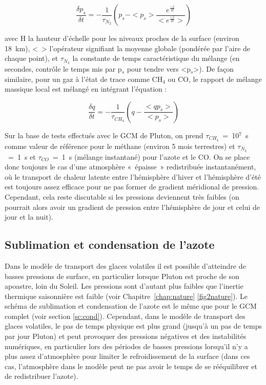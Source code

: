 \begin{equation}
\label{eq:newton}
\frac{\delta p_s}{\delta t}= -\frac{1}{\tau_{N_2}}\left ( p_s-< p_s> \frac{e^{\frac{-z}{H}}}{< e^{\frac{-z}{H}}> } \right )
\end{equation}

avec H  la hauteur d’échelle pour les niveaux proches de la surface (environ 18~km), <~> l’opérateur signifiant la moyenne globale (pondérée par l’aire de chaque point), et $\tau_{N_{2}}$ la constante de temps caractéristique du mélange (en secondes, contrôle le temps mis par p$_s$ pour tendre vers <p$_s$>). De façon similaire, pour un gaz à l’état de trace comme CH$_4$ ou CO, le rapport de mélange massique local est mélangé en intégrant l'équation : 

\begin{equation}
\frac{\delta q}{\delta t}= -\frac{1}{\tau_{CH_4}}\left ( q-\frac{< q p_s >}{< p_s >} \right )
\end{equation}

Sur la base de tests effectués avec le GCM de Pluton, on prend $\tau_{CH_4}$~=~10$^7$~s comme valeur de référence pour le méthane (environ 5 mois terrestres) et $\tau_{N_2}$~=~1~s et $\tau_{CO}$~=~1~s (mélange instantané) pour l’azote et le CO. 
On se place donc toujours le cas d’une atmosphère «~épaisse~» redistribuée instantanément, où le transport de chaleur latente entre l’hémisphère d’hiver et l’hémisphère d’été est toujours assez efficace pour ne pas former de gradient méridional de pression. Cependant, cela reste discutable si les pressions deviennent très faibles (on pourrait alors avoir un gradient de pression entre l'hémisphère de jour et celui de jour et la nuit). 

\subsection{Sublimation et condensation de l'azote}

Dans le modèle de transport des glaces volatiles il est possible d’atteindre de basses pressions de surface, en particulier lorsque Pluton est proche de son apoastre, loin du Soleil. Les pressions sont d’autant plus faibles que l’inertie thermique saisonnière est faible (voir Chapitre~\ref{chap:nature} \autoref{fig2nature}).
Le schéma de sublimation et condensation de l’azote est le même que pour le GCM complet (voir section \ref{sc:cond}). Cependant, dans le modèle de transport des glaces volatiles, le pas de temps physique est plus grand (jusqu’à un pas de temps par jour Pluton) et peut provoquer des pressions négatives et des instabilités numériques, en particulier lors des périodes de basses pressions lorsqu’il n'y a plus assez d'atmosphère pour limiter le refroidissement de la surface (dans ces cas, l’atmosphère dans le modèle peut ne pas avoir le temps de se rééquilibrer et de redistribuer l'azote).

